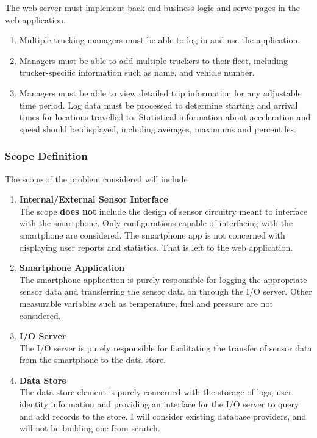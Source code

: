 \begin{enumerate}
The web server must implement back-end business logic and serve pages in the web application.
    \begin{enumerate}
        \item Multiple trucking managers must be able to log in and use the application.
        \item Managers must be able to add multiple truckers to their fleet, including trucker-specific information such as name, and vehicle number.
        \item Managers must be able to view detailed trip information for any adjustable time period. Log data must be processed to determine starting and arrival times for locations travelled to. Statistical information about acceleration and speed should be displayed, including averages, maximums and percentiles.
    \end{enumerate}
\end{enumerate}
\subsubsection{Scope Definition}
The scope of the problem considered will include
\begin{enumerate}
\item \textbf{Internal/External Sensor Interface}\\
The scope \textbf{does not} include the design of sensor circuitry meant to interface with the smartphone. Only configurations capable of interfacing with the smartphone are considered.
The smartphone app is not concerned with displaying user reports and statistics. That is left to the web application.
\item \textbf{Smartphone Application}\\
The smartphone application is purely responsible for logging the appropriate sensor data and transferring the sensor data on through the I/O server.
Other measurable variables such as temperature, fuel and pressure are not considered.
\item \textbf{I/O Server}\\
The I/O server is purely responsible for facilitating the transfer of sensor data from the smartphone to the data store.
\item \textbf{Data Store}\\
    The data store element is purely concerned with the storage of logs, user identity information and providing an interface for the I/O server to query and add records to the store.
    I will consider existing database providers, and will not be building one from scratch. 
\end{enumerate}

